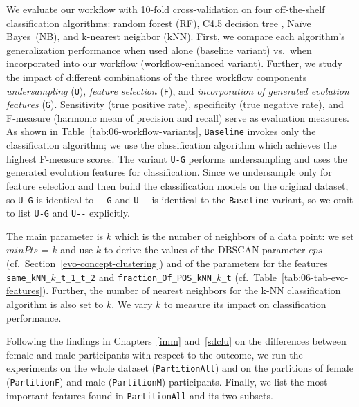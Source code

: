 \documentclass[
  oneside]{book}
\begin{document}
We evaluate our workflow with 10-fold cross-validation on four off-the-shelf classification algorithms: random forest \autocite{Breiman:RandomForests2001} (RF), C4.5 decision tree \autocite{Quinlan:C451993}, Naïve Bayes~(NB), and k-nearest neighbor (kNN).
First, we compare each algorithm's generalization performance when used alone (baseline variant) vs.~when incorporated into our workflow (workflow-enhanced variant).
Further, we study the impact of different combinations of the three workflow components \emph{undersampling} (\texttt{U}), \emph{feature selection} (\texttt{F}), and \emph{incorporation of generated evolution features} (\texttt{G}).
Sensitivity (true positive rate), specificity (true negative rate), and F-measure (harmonic mean of precision and recall) serve as evaluation measures.
As shown in Table~\ref{tab:06-workflow-variants}, \texttt{Baseline} invokes only the classification algorithm; we use the classification algorithm which achieves the highest F-measure scores.
The variant \texttt{U-G} performs undersampling and uses the generated evolution features for classification.
Since we undersample only for feature selection and then build the classification models on the original dataset, so \texttt{U-G} is identical to \texttt{-\/-G} and \texttt{U-\/-} is identical to the \texttt{Baseline} variant, so we omit to list \texttt{U-G} and \texttt{U-\/-} explicitly.

The main parameter is \(k\) which is the number of neighbors of a data point: we set \(minPts\) = \(k\) and use \(k\) to derive the values of the DBSCAN parameter \(eps\) (cf.~Section~\ref{evo-concept-clustering}) and of the parameters for the features \texttt{same\_kNN\_}\(k\)\texttt{\_t\_1\_t\_2} and \texttt{fraction\_Of\_POS\_kNN\_}\(k\)\texttt{\_t} (cf.~Table~\ref{tab:06-tab-evo-features}).
Further, the number of nearest neighbors for the k-NN classification algorithm is also set to \(k\).
We vary \(k\) to measure its impact on classification performance.

Following the findings in Chapters~\ref{imm} and~\ref{sdclu} on the differences between female and male participants with respect to the outcome, we run the experiments on the whole dataset (\texttt{PartitionAll}) and on the partitions of female (\texttt{PartitionF}) and male (\texttt{PartitionM}) participants.
Finally, we list the most important features found in \texttt{PartitionAll} and its two subsets.
\end{document}
